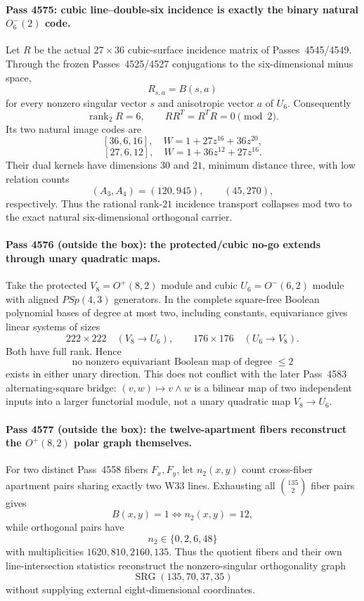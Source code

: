 \paragraph{Pass 4575: cubic line--double-six incidence is exactly the binary natural $O^-_6(2)$ code.}
Let $R$ be the actual $27\times36$ cubic-surface incidence matrix of Passes~4545/4549.  Through the frozen Passes~4525/4527 conjugations to the six-dimensional minus space,
\[
 \boxed{R_{s,a}=B(s,a)}
\]
for every nonzero singular vector $s$ and anisotropic vector $a$ of $U_6$.  Consequently
\[
 \boxed{\operatorname{rank}_2R=6,\qquad RR^T=R^TR=0\pmod2.}
\]
Its two natural image codes are
\[
 \boxed{[36,6,16],\quad W=1+27z^{16}+36z^{20}},
\]
\[
 \boxed{[27,6,12],\quad W=1+36z^{12}+27z^{16}}.
\]
Their dual kernels have dimensions $30$ and $21$, minimum distance three, with low relation counts
\[
 (A_3,A_4)=(120,945),\qquad(45,270),
\]
respectively.  Thus the rational rank-$21$ incidence transport collapses mod two to the exact natural six-dimensional orthogonal carrier.

\paragraph{Pass 4576 (outside the box): the protected/cubic no-go extends through unary quadratic maps.}
Take the protected $V_8=O^+(8,2)$ module and cubic $U_6=O^-(6,2)$ module with aligned $PSp(4,3)$ generators.  In the complete square-free Boolean polynomial bases of degree at most two, including constants, equivariance gives linear systems of sizes
\[
 222\times222\quad(V_8\to U_6),
 \qquad
 176\times176\quad(U_6\to V_8).
\]
Both have full rank.  Hence
\[
 \boxed{\text{no nonzero equivariant Boolean map of degree }\le2}
\]
exists in either unary direction.  This does not conflict with the later Pass~4583 alternating-square bridge: $(v,w)\mapsto v\wedge w$ is a bilinear map of two independent inputs into a larger functorial module, not a unary quadratic map $V_8\to U_6$.

\paragraph{Pass 4577 (outside the box): the twelve-apartment fibers reconstruct the $O^+(8,2)$ polar graph themselves.}
For two distinct Pass~4558 fibers $F_x,F_y$, let $n_2(x,y)$ count cross-fiber apartment pairs sharing exactly two W33 lines.  Exhausting all $\binom{135}{2}$ fiber pairs gives
\[
 \boxed{B(x,y)=1\iff n_2(x,y)=12,}
\]
while orthogonal pairs have
\[
 n_2\in\{0,2,6,48\}
\]
with multiplicities $1620,810,2160,135$.  Thus the quotient fibers and their own line-intersection statistics reconstruct the nonzero-singular orthogonality graph
\[
 \boxed{\operatorname{SRG}(135,70,37,35)}
\]
without supplying external eight-dimensional coordinates.

